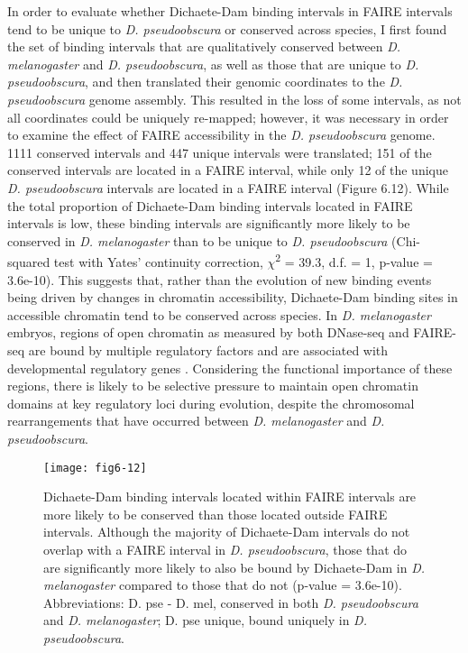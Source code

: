 In order to evaluate whether Dichaete-Dam binding intervals in FAIRE intervals tend to be unique to \emph{D. pseudoobscura} or conserved across species, I first found the set of binding intervals that are qualitatively conserved between \emph{D. melanogaster} and \emph{D. pseudoobscura}, as well as those that are unique to \emph{D. pseudoobscura}, and then translated their genomic coordinates to the \emph{D. pseudoobscura} genome assembly. This resulted in the loss of some intervals, as not all coordinates could be uniquely re-mapped; however, it was necessary in order to examine the effect of FAIRE accessibility in the \emph{D. pseudoobscura} genome. 1111 conserved intervals and 447 unique intervals were translated; 151 of the conserved intervals are located in a FAIRE interval, while only 12 of the unique \emph{D. pseudoobscura} intervals are located in a FAIRE interval (Figure 6.12). While the total proportion of Dichaete-Dam binding intervals located in FAIRE intervals is low, these binding intervals are significantly more likely to be conserved in \emph{D. melanogaster} than to be unique to \emph{D. pseudoobscura} (Chi-squared test with Yates’ continuity correction, \(\chi\)\textsuperscript{2} = 39.3, d.f. = 1, p-value = 3.6e-10). This suggests that, rather than the evolution of new binding events being driven by changes in chromatin accessibility, Dichaete-Dam binding sites in accessible chromatin tend to be conserved across species. In \emph{D. melanogaster} embryos, regions of open chromatin as measured by both DNase-seq and FAIRE-seq are bound by multiple regulatory factors and are associated with developmental regulatory genes \citep{mckay_common_2013,thomas_dynamic_2011}. Considering the functional importance of these regions, there is likely to be selective pressure to maintain open chromatin domains at key regulatory loci during evolution, despite the chromosomal rearrangements that have occurred between \emph{D. melanogaster} and \emph{D. pseudoobscura}.

\begin{figure}
\centering
\texttt{[image: fig6-12]}
\caption[Dichaete-Dam binding intervals located within FAIRE intervals are more likely to be conserved than those located outside FAIRE intervals]{Dichaete-Dam binding intervals located within FAIRE intervals are more likely to be conserved than those located outside FAIRE intervals. Although the majority of Dichaete-Dam intervals do not overlap with a FAIRE interval in \emph{D. pseudoobscura}, those that do are significantly more likely to also be bound by Dichaete-Dam in \emph{D. melanogaster} compared to those that do not (p-value = 3.6e-10). Abbreviations: D. pse - D. mel, conserved in both \emph{D. pseudoobscura} and \emph{D. melanogaster}; D. pse unique, bound uniquely in \emph{D. pseudoobscura}.}
\label{Figure 6.12}
\end{figure}

